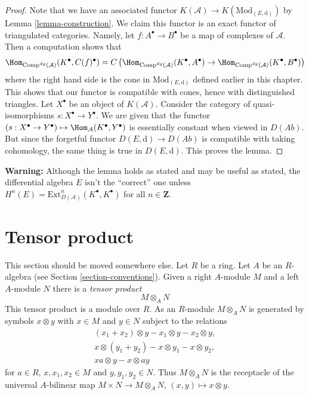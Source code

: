 \begin{proof}
Note that we have an associated functor
$K(\mathcal{A}) \to K(\text{Mod}_{(E, \text{d})})$ by
Lemma \ref{lemma-construction}.
We claim this functor is an exact functor of triangulated categories.
Namely, let $f : A^\bullet \to B^\bullet$ be a map of complexes
of $\mathcal{A}$. Then a computation shows that
$$
\Hom_{\text{Comp}^{dg}(\mathcal{A})}(K^\bullet, C(f)^\bullet)
=
C\left(
\Hom_{\text{Comp}^{dg}(\mathcal{A})}(K^\bullet, A^\bullet) \to
\Hom_{\text{Comp}^{dg}(\mathcal{A})}(K^\bullet, B^\bullet)
\right)
$$
where the right hand side is the cone in $\text{Mod}_{(E, \text{d})}$
defined earlier in this chapter.
This shows that our functor is compatible with cones, hence with
distinguished triangles. Let $X^\bullet$ be an object of $K(\mathcal{A})$.
Consider the category of quasi-isomorphisms $s : X^\bullet \to Y^\bullet$.
We are given that the functor
$(s : X^\bullet \to Y^\bullet) \mapsto \Hom_\mathcal{A}(K^\bullet, Y^\bullet)$
is essentially constant when viewed in $D(\textit{Ab})$.
But since the forgetful functor $D(E, \text{d}) \to D(\textit{Ab})$
is compatible with taking cohomology, the same thing is true in
$D(E, \text{d})$. This proves the lemma.
\end{proof}

\noindent
{\bf Warning:} Although the lemma holds as stated and may be useful
as stated, the differential algebra $E$ isn't the ``correct'' one unless
$H^n(E) = \text{Ext}^n_{D(\mathcal{A})}(K^\bullet, K^\bullet)$
for all $n \in \mathbf{Z}$.




\section{Tensor product}
\label{section-tensor-product}

\noindent
This section should be moved somewhere else. Let $R$ be a ring.
Let $A$ be an $R$-algebra (see Section \ref{section-conventions}).
Given a right $A$-module $M$ and a left $A$-module $N$ there is
a {\it tensor product}
$$
M \otimes_A N
$$
This tensor product is a module over $R$. As an $R$-module $M \otimes_A N$
is generated by symbols $x \otimes y$ with $x \in M$ and $y \in N$ subject
to the relations
$$
\begin{matrix}
(x_1 + x_2) \otimes y - x_1 \otimes y - x_2 \otimes y, \\
x \otimes (y_1 + y_2) - x \otimes y_1 - x \otimes y_2, \\
xa \otimes y - x \otimes ay
\end{matrix}
$$
for $a \in R$, $x, x_1, x_2 \in M$
and $y, y_1, y_2 \in N$. Thus $M \otimes_A N$ is the receptacle
of the universal $A$-bilinear map $M \times N \to M \otimes_A N$,
$(x, y) \mapsto x \otimes y$.

